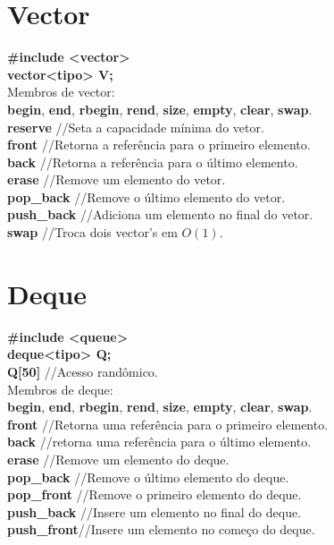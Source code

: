 \begin{multicols}{2}
\section{Vector}

\textbf{\#include <vector>}\\
\textbf{vector<tipo> V;}\\

Membros de vector:\\
\textbf{begin}, \textbf{end}, \textbf{rbegin}, \textbf{rend}, \textbf{size}, \textbf{empty}, \textbf{clear}, \textbf{swap}.\\
\textbf{reserve} //Seta a capacidade mínima do vetor.\\
\textbf{front} //Retorna a referência para o primeiro elemento.\\
\textbf{back} //Retorna a referência para o último elemento.\\
\textbf{erase} //Remove um elemento do vetor.\\
\textbf{pop\_back} //Remove o último elemento do vetor.\\
\textbf{push\_back} //Adiciona um elemento no final do vetor.\\
\textbf{swap} //Troca dois vector's em $O(1)$.

\section{Deque}

\textbf{\#include <queue>}\\
\textbf{deque<tipo> Q;}\\
\textbf{Q[50]} //Acesso randômico.\\

Membros de deque:\\
\textbf{begin}, \textbf{end}, \textbf{rbegin}, \textbf{rend}, \textbf{size}, \textbf{empty}, \textbf{clear}, \textbf{swap}.\\
\textbf{front}	//Retorna uma referência para o primeiro elemento.\\
\textbf{back}	//retorna uma referência para o último elemento.\\
\textbf{erase}	//Remove um elemento do deque.\\
\textbf{pop\_back}	//Remove o último elemento do deque.\\
\textbf{pop\_front}	//Remove o primeiro elemento do deque.\\
\textbf{push\_back}	//Insere um elemento no final do deque.\\
\textbf{push\_front}//Insere um elemento no começo do deque.\\


\end{multicols}
